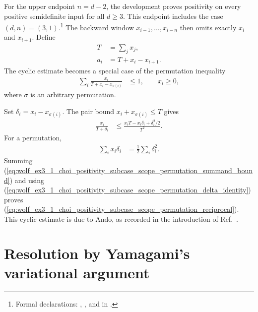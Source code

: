 \documentclass{article}
\begin{document}
For the upper endpoint $n=d-2$, the development proves positivity on every
positive semidefinite input for all $d\geq 3$. This endpoint includes the case
$(d,n)=(3,1)$.\footnote{Formal declarations:
,
, and
 in
.}
The backward window $x_{i-1},\ldots,x_{i-n}$ then omits exactly $x_i$ and
$x_{i+1}$. Define
\begin{align}
    T
        &=\sum_j x_j,
    \label{eq:wolf_ex3_1_choi_positivity_subcase_scope_total_mass}\\
    a_i
        &=T+x_i-x_{i+1}.
    \label{eq:wolf_ex3_1_choi_positivity_subcase_scope_upper_endpoint_weight}
\end{align}
The cyclic estimate becomes a special case of the permutation inequality
\begin{align}
    \sum_i\frac{x_i}{T+x_i-x_{\sigma(i)}}
        &\leq 1,
    \qquad x_i\geq 0,
    \label{eq:wolf_ex3_1_choi_positivity_subcase_scope_permutation_reciprocal}
\end{align}
where $\sigma$ is an arbitrary permutation.

Set $\delta_i=x_i-x_{\sigma(i)}$. The pair bound
$x_i+x_{\sigma(i)}\leq T$ gives
\begin{align}
    \frac{x_i}{T+\delta_i}
        &\leq
        \frac{x_iT-x_i\delta_i+\delta_i^2/2}{T^2}.
    \label{eq:wolf_ex3_1_choi_positivity_subcase_scope_permutation_summand_bound}
\end{align}
For a permutation,
\begin{align}
    \sum_i x_i\delta_i
        &=\frac{1}{2}\sum_i\delta_i^2.
    \label{eq:wolf_ex3_1_choi_positivity_subcase_scope_permutation_delta_identity}
\end{align}
Summing
(\ref{eq:wolf_ex3_1_choi_positivity_subcase_scope_permutation_summand_bound})
and using
(\ref{eq:wolf_ex3_1_choi_positivity_subcase_scope_permutation_delta_identity})
proves
(\ref{eq:wolf_ex3_1_choi_positivity_subcase_scope_permutation_reciprocal}).
This cyclic estimate is due to Ando, as recorded in the introduction of
Ref.~\cite{Yamagami1993Cyclic}.

\section{Resolution by Yamagami's variational argument}
\end{document}

